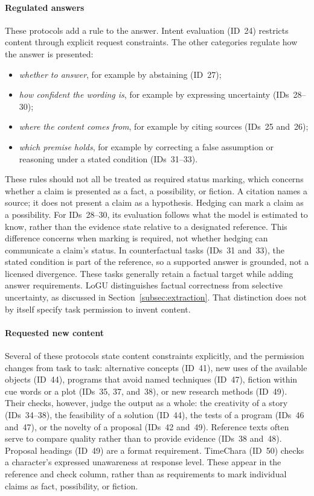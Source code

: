 \documentclass{clv2025}
\begin{document}
\paragraph{Regulated answers}
These protocols add a rule to the answer. Intent evaluation (ID~24) restricts
content through explicit request constraints. The other categories
regulate how the answer is presented:
\begin{itemize}
\item \emph{whether to answer}, for example by abstaining (ID~27);
\item \emph{how confident the wording is}, for example by expressing
uncertainty (IDs~28--30);
\item \emph{where the content comes from}, for example by citing sources
(IDs~25 and~26);
\item \emph{which premise holds}, for example by correcting a false
assumption or reasoning under a stated condition (IDs~31--33).
\end{itemize}
These rules should not all be treated as required status marking, which
concerns whether a claim is presented as a fact, a possibility, or fiction.
A citation names a source; it does not present a claim as a hypothesis.
Hedging can mark a claim as a possibility. For IDs~28--30, its evaluation
follows what the model is estimated to know, rather than the evidence state
relative to a designated reference. This difference concerns when marking
is required, not whether hedging can communicate a claim's status. In
counterfactual tasks (IDs~31 and~33), the stated condition is part of the reference, so a
supported answer is grounded, not a licensed divergence. These tasks generally retain a factual target while adding answer
requirements. LoGU distinguishes factual correctness from selective
uncertainty, as discussed in Section~\ref{subsec:extraction}. That distinction
does not by itself specify task permission to invent content.

\paragraph{Requested new content}
Several of these protocols state content constraints explicitly, and the permission changes
from task to task: alternative concepts (ID~41), new uses of the available
objects (ID~44), programs that avoid named techniques (ID~47), fiction
within cue words or a plot (IDs~35, 37, and~38), or new research methods
(ID~49). Their checks, however, judge the output as a whole: the
creativity of a story (IDs~34--38), the feasibility of a solution
(ID~44), the tests of a program (IDs~46 and~47), or the novelty of a
proposal (IDs~42 and~49). Reference texts often serve to
compare quality rather than to provide evidence (IDs~38 and~48).
Proposal headings (ID~49) are a format requirement. TimeChara (ID~50)
checks a character's expressed unawareness at response level. These appear
in the reference and check column, rather than as requirements to mark
individual claims as fact, possibility, or fiction.
\end{document}
